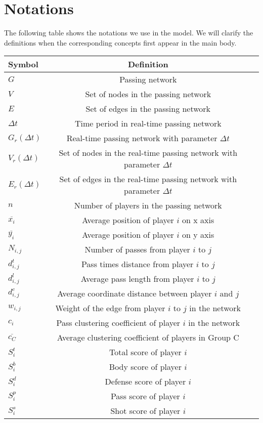 \documentclass{mcmthesis}
\begin{document}
\section{Notations}\label{Sec-Nomen}
The following table shows the notations we use in the model. We will clarify the definitions when the corresponding concepts first appear in the main body.
\begin{table}[htbp]
 \centering
 \begin{spacing}{1.19}

 \begin{tabular}{lcl}
  \toprule
  Symbol & Definition \\
  \midrule
 $G$ & Passing network \\
 $V$ & Set of nodes in the passing network\\
 $E$ & Set of edges in the passing network\\
 $\Delta t$ & Time period in real-time passing network\\
 $G_{r}(\Delta t)$ & Real-time passing network with parameter $\Delta t$\\
 $V_{r}(\Delta t)$ & Set of nodes in the real-time passing network with parameter $\Delta t$\\
 $E_{r}(\Delta t)$ & Set of edges in the real-time passing network with parameter $\Delta t$\\
 $n$ & Number of players in the passing network\\
 $\overline{x_i}$ & Average position of player $i$ on x axis\\
 $\overline{y_i}$  & Average position of player $i$ on y axis\\
 $N_{i,j}$ & Number of passes from player $i$ to $j$  \\
 $d_{i,j}^{t}$ & Pass times distance from player $i$ to $j$\\
 $d_{i,j}^{l}$ & Average pass length from player $i$ to $j$  \\
 $d_{i,j}^{c}$ & Average coordinate distance between player $i$ and $j$\\
 $w_{i,j}$ & Weight of the edge from player $i$ to $j$ in the network\\
 $c_{i}$ & Pass clustering coefficient of player $i$ in the network\\
 $\overline{c_{C}}$ & Average clustering coefficient of players in Group C\\
 $S^{t}_{i}$ & Total score of player $i$\\
 $S^{b}_{i}$ & Body score of player $i$\\
 $S^{d}_{i}$ & Defense score of player $i$\\
 $S^{p}_{i}$ & Pass score of player $i$\\
 $S^{s}_{i}$ & Shot score of player $i$\\


  \bottomrule
 \end{tabular}
 \end{spacing}
\end{table}
\end{document}
